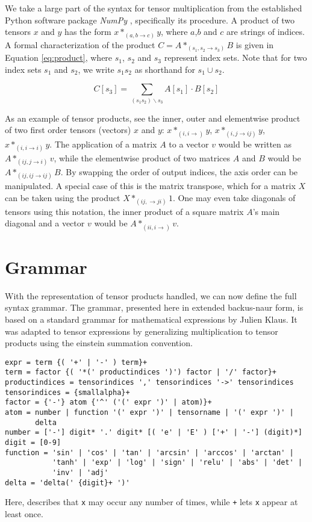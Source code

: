 \documentclass[12pt, a4paper]{report}
\begin{document}
We take a large part of the syntax for tensor multiplication from the established Python software package \textit{NumPy} \cite{numpy}, specifically its  procedure.
A product of two tensors $x$ and $y$ has the form $x*_{(a,b \rightarrow c)}y$, where $a$,$b$ and $c$ are strings of indices.
A formal characterization of the product $C = A *_{(s_1,s_2 \rightarrow s_3)} B$ is given in Equation \ref{eq:product}, where $s_1$, $s_2$ and $s_3$ represent index sets.
Note that for two index sets $s_1$ and $s_2$, we write $s_1 s_2$ as shorthand for $s_1 \cup s_2$.

\begin{equation}
    C[s_3] = \sum_{(s_1 s_2)  \backslash s_3} A[s_1] \cdot B[s_2]
    \label{eq:product}
\end{equation}

As an example of tensor products, see the inner, outer and elementwise product of two first order tensors (vectors) $x$ and $y$: $x*_{(i,i \rightarrow)}y$, $x*_{(i,j \rightarrow ij)}y$, $x*_{(i,i \rightarrow i)}y$.
The application of a matrix $A$ to a vector $v$ would be written as $A*_{(ij,j \rightarrow i)}v$, while the elementwise product of two matrices $A$ and $B$ would be $A*_{(ij,ij \rightarrow ij)}B$.
By swapping the order of output indices, the axis order can be manipulated.
A special case of this is the matrix transpose, which for a matrix $X$ can be taken using the product $X *_{(ij, \rightarrow ji)} 1$.
One may even take diagonals of tensors using this notation, the inner product of a square matrix $A$'s main diagonal and a vector $v$ would be $A*_{(ii,i \rightarrow)}v$.


\section{Grammar}
With the representation of tensor products handled, we can now define the full syntax grammar.
The grammar, presented here in extended backus-naur form, is based on a standard grammar for mathematical expressions by Julien Klaus. %
It was adapted to tensor expressions by generalizing multiplication to tensor products using the einstein summation convention.
\begin{verbatim}
expr = term {( '+' | '-' ) term}+
term = factor {( '*(' productindices ')') factor | '/' factor}+
productindices = tensorindices ',' tensorindices '->' tensorindices
tensorindices = {smallalpha}+
factor = {'-'} atom {'^' ('(' expr ')' | atom)}+
atom = number | function '(' expr ')' | tensorname | '(' expr ')' | 
       delta
number = ['-'] digit* '.' digit* [( 'e' | 'E' ) ['+' | '-'] (digit)*]
digit = [0-9]
function = 'sin' | 'cos' | 'tan' | 'arcsin' | 'arccos' | 'arctan' | 
           'tanh' | 'exp' | 'log' | 'sign' | 'relu' | 'abs' | 'det' | 
           'inv' | 'adj'    
delta = 'delta(' {digit}+ ')' 
\end{verbatim}
Here, \texttt{} describes that \texttt{x} may occur any number of times, while \texttt{+} lets \texttt{x} appear at least once.
\end{document}
